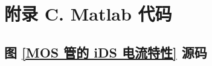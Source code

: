\documentclass[UTF8]{report}
\theoremstyle{MyLineTheoremStyle} %
\theoremstyle{MyBlockTheoremStyle} %
\theoremstyle{MySubsubsectionStyle} %
\begin{document}
\chapter*{附录 C. Matlab 代码}   
\thispagestyle{fancy} 
\setcounter{chapter}{3} 
\setcounter{section}{0}   
\renewcommand\thesection{C.\arabic{section}}   
\renewcommand{\thefigure}{C.\arabic{figure}} 
\renewcommand{\thetable}{C.\arabic{table}}

\section{图 \ref{MOS 管的 iDS 电流特性} 源码}
\label{MOS 管的 iDS 电流特性 源码}

\end{document}
